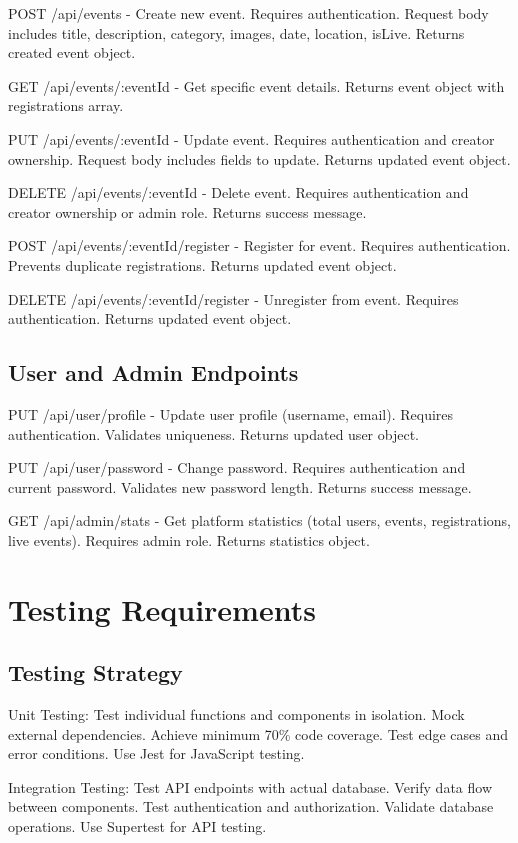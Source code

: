 ﻿\documentclass[11pt]{article}
\begin{document}
POST /api/events - Create new event. Requires authentication. Request body includes title, description, category, images, date, location, isLive. Returns created event object.

GET /api/events/:eventId - Get specific event details. Returns event object with registrations array.

PUT /api/events/:eventId - Update event. Requires authentication and creator ownership. Request body includes fields to update. Returns updated event object.

DELETE /api/events/:eventId - Delete event. Requires authentication and creator ownership or admin role. Returns success message.

POST /api/events/:eventId/register - Register for event. Requires authentication. Prevents duplicate registrations. Returns updated event object.

DELETE /api/events/:eventId/register - Unregister from event. Requires authentication. Returns updated event object.

\subsection{User and Admin Endpoints}
PUT /api/user/profile - Update user profile (username, email). Requires authentication. Validates uniqueness. Returns updated user object.

PUT /api/user/password - Change password. Requires authentication and current password. Validates new password length. Returns success message.

GET /api/admin/stats - Get platform statistics (total users, events, registrations, live events). Requires admin role. Returns statistics object.

\section{Testing Requirements}

\subsection{Testing Strategy}
Unit Testing: Test individual functions and components in isolation. Mock external dependencies. Achieve minimum 70\% code coverage. Test edge cases and error conditions. Use Jest for JavaScript testing.

Integration Testing: Test API endpoints with actual database. Verify data flow between components. Test authentication and authorization. Validate database operations. Use Supertest for API testing.
\end{document}

